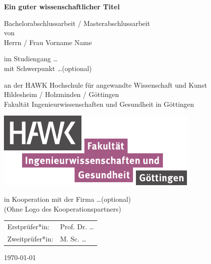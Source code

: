 

\begin{titlepage}
	\begin{center}
		{\Large \textbf{Ein guter wissenschaftlicher Titel}}
		
		\vspace{\fill}
		
		Bachelorabschlussarbeit / Masterabschlussarbeit \\
		von \\
		Herrn / Frau Vorname Name
		
		\vspace{0.9cm}
		
		im Studiengang \dots \\
		mit Schwerpunkt \dots (optional)\\
		
		\vspace{0.9cm}
		
		an der HAWK Hochschule für angewandte Wissenschaft und Kunst\\
		Hildesheim / Holzminden / Göttingen\\
		Fakultät Ingenieurwissenschaften und Gesundheit in Göttingen
		
		\vspace{0.1cm}
		
		\includegraphics[height=3.cm]{pic/hawk-fi-logo}
		
		\vspace{0.1cm}
		
		in Kooperation mit der Firma \dots (optional)\\
		(Ohne Logo des Kooperationspartners)
		
		\vspace{2.0cm}
		
		\begin{tabular}{p{3cm}l}
			Erstprüfer*in: & Prof. Dr. \dots \\ 
			Zweitprüfer*in: & M. Sc. \dots \\  
		\end{tabular} 
		
		\vspace{1.6cm}
	
		\today
		
	\end{center}
	
	
	
\end{titlepage}